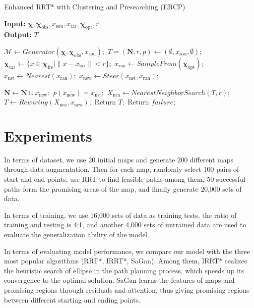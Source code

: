 \documentclass[smallcondensed]{svjour3}     %
\begin{document}
\begin{algorithm}
	\caption{Enhanced RRT* with Clustering and Presearching (ERCP)}
	\label{algorithm: ercp-RRT*}
	\hspace*{0.02in} {\bf Input:} $\bm{\chi}, \bm{\chi}_{\textrm{obs}}, x_{\textrm{sou}}, x_{\textrm{tar}}, \bm{\chi}_{\textrm{opt}}, r$ \\
	\hspace*{0.02in} {\bf Output:} $T$
	\begin{algorithmic}[1]
		\State $\mathcal{M} \leftarrow Generator(\bm{\chi}, \bm{\chi}_{\textrm{obs}}, x_{\textrm{sou}}); $
		\State $T = (\mathbf{N}, r, p) \leftarrow (\emptyset, x_{\textrm{sou}}, \emptyset) ;$
		\State $\bm{\chi}_{\textrm{tar}} \leftarrow \{x \in \bm{\chi}_{\textrm{fre}} \vert \lVert x - x_{\textrm{tar}} \rVert < r\} ;$
			\State $x_{\textrm{ran}} \leftarrow SampleFrom(\bm{\chi}_{\textrm{opt}}) ;$
			\State $x_{\textrm{nst}} \leftarrow Nearest(x_{\textrm{ran}}) ;$
			\State $x_{\textrm{new}} \leftarrow Steer(x_{\textrm{nst}}, x_{\textrm{ran}}) ;$

				\State $\mathbf{N} \leftarrow \mathbf{N} \cup x_{\textrm{new}} ;$
				\State $p(x_{\textrm{new}}) = x_{\textrm{nst}} ;$
				\State $X_{\textrm{nea}} \leftarrow NearestNeighborSearch(T, r) ;$
				\State $T \leftarrow Rewiring(X_{\textrm{nea}}, x_{\textrm{new}}) ;$
					\State Return $T ;$
				\EndIf
			\EndIf
		\EndFor
		\State Return $failure ;$
	\end{algorithmic}
\end{algorithm}

\section{Experiments}\label{section: Experiments}
In terms of dataset, we use 20 initial maps and generate 200 different maps through data augmentation. 
Then for each map, randomly select 100 pairs of start and end points, use RRT to find feasible paths among them, 50 successful paths form the promising areas of the map, and finally generate 20,000 sets of data.

In terms of training, we use 16,000 sets of data as training tests, the ratio of training and testing is 4:1, and another 4,000 sets of untrained data are used to evaluate the generalization ability of the model.

In terms of evaluating model performance, we compare our model with the three most popular algorithms (RRT*, IRRT*, SaGan). 
Among them, IRRT* realizes the heuristic search of ellipse in the path planning process, which speeds up its convergence to the optimal solution. 
SaGan learns the features of maps and promising regions through residuals and attention, thus giving promising regions between different starting and ending points.
\end{document}
